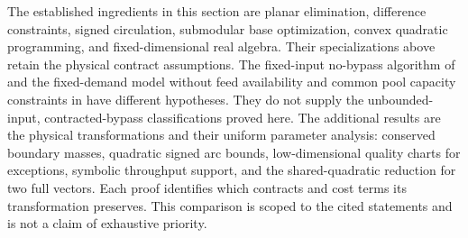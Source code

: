The established ingredients in this section are planar elimination,
difference constraints, signed circulation, submodular base optimization,
convex quadratic programming, and fixed-dimensional real algebra. Their
specializations above retain the physical contract assumptions. The
fixed-input no-bypass algorithm of \citet[Theorem~1]{s4:boland2017}
and the fixed-demand model without feed availability and common pool
capacity constraints in \citet[Assumption~2.2]{s3:baltean2018} have
different hypotheses. They do not supply the unbounded-input,
contracted-bypass classifications proved here. The additional results
are the physical transformations and their uniform parameter analysis:
conserved boundary masses, quadratic signed arc bounds, low-dimensional
quality charts for exceptions, symbolic throughput support, and the
shared-quadratic reduction for two full vectors. Each proof identifies
which contracts and cost terms its transformation preserves. This
comparison is scoped to the cited statements and is not a claim of
exhaustive priority.
